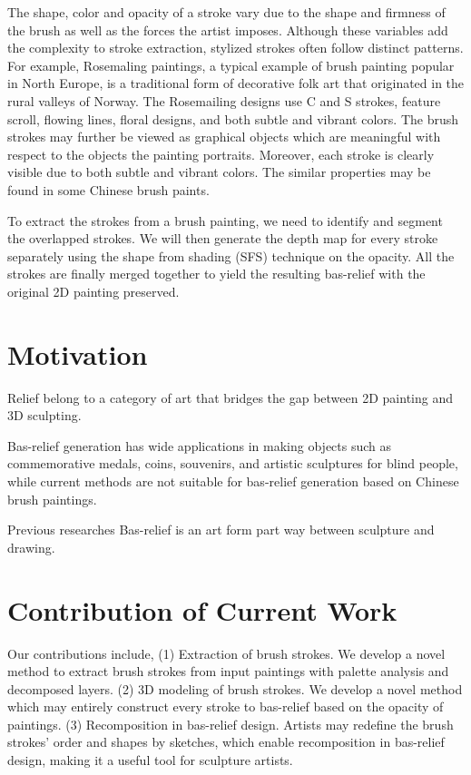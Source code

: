 The shape, color and opacity of a stroke vary due to the shape and firmness of the brush as well as the forces the artist imposes. Although these variables add the complexity to stroke extraction, stylized strokes often follow distinct patterns. For example, Rosemaling paintings, a typical example of brush painting popular in North Europe, is a traditional form of decorative folk art that originated in the rural valleys of Norway. The Rosemailing designs use C and S strokes, feature scroll, flowing lines, floral designs, and both subtle and vibrant colors. The brush strokes may further be viewed as graphical objects which are meaningful with respect to the objects the painting portraits. Moreover, each stroke is clearly visible due to both subtle and vibrant colors. The similar properties may be found in some Chinese brush paints.

To extract the strokes from a brush painting, we need to identify and segment the overlapped strokes. We will then generate the depth map for every stroke separately using the shape from shading (SFS) technique on the opacity. All the strokes are finally merged together to yield the resulting bas-relief with the original 2D painting preserved. 

\section{Motivation}

Relief belong to a category of art that bridges the gap between 2D painting and 3D sculpting\cite{kerber2012computer}.

Bas-relief generation has wide applications in making objects such as commemorative medals, coins, souvenirs, and artistic sculptures for blind people, while current methods are not suitable for bas-relief generation based on Chinese brush paintings. 


Previous researches 
Bas-relief is an art form part way between sculpture and drawing. \cite{zeng2014region} 


\section{Contribution of Current Work}
Our contributions include,
\newline
(1) Extraction of brush strokes. We develop a novel method to extract brush strokes from input paintings with palette analysis and decomposed layers.
\newline
(2) 3D modeling of brush strokes. We develop a novel method which may entirely construct every stroke to bas-relief based on the opacity of paintings.
\newline
(3) Recomposition in bas-relief design. Artists may redefine the brush strokes’ order and shapes by sketches, which enable recomposition in bas-relief design, making it a useful tool for sculpture artists.

